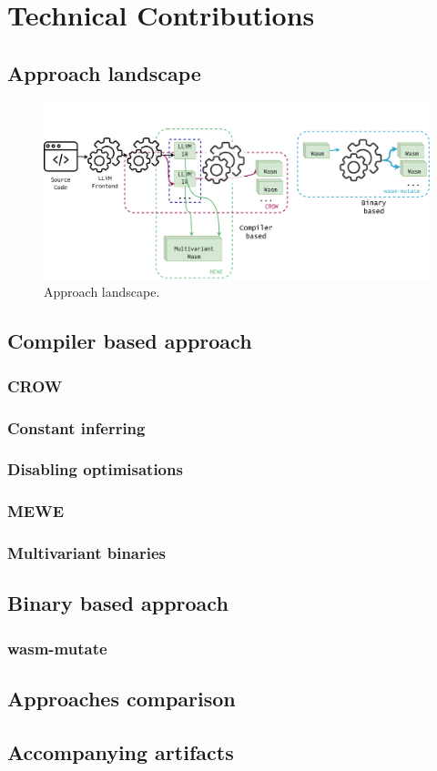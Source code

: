 \chapter{Technical Contributions}
\label{tech}

\section{Approach landscape}

\begin{figure}[h]
	\centering
	\includegraphics[width=1.0\textwidth]{figures/landscape.pdf}
	\caption{Approach landscape.}
	\label{fig:approach_landscape}
\end{figure}

\section{Compiler based approach}

\subsection{CROW}

\subsection{Constant inferring}

\subsection{Disabling optimisations}

\subsection{MEWE}

\subsection{Multivariant binaries}

\section{Binary based approach}

\subsection{wasm-mutate}

\section{Approaches comparison}

\section{Accompanying artifacts}
